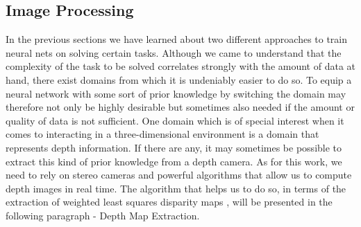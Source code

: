 \FloatBarrier
\subsection{Image Processing}
\label{sec::224_ip}
In the previous sections we have learned about two different approaches to train neural nets on solving certain tasks. Although we came to understand that the complexity of the task to be solved correlates strongly with the amount of data at hand, there exist domains from which it is undeniably easier to do so. To equip a neural network with some sort of prior knowledge by switching the domain may therefore not only be highly desirable but sometimes also needed if the amount or quality of data is not sufficient. One domain which is of special interest when it comes to interacting in a three-dimensional environment is a domain that represents depth information. If there are any, it may sometimes be possible to extract this kind of prior knowledge from a depth camera. As for this work, we need to rely on stereo cameras and powerful algorithms that allow us to compute depth images in real time. The algorithm that helps us to do so, in terms of the extraction of weighted least squares disparity maps \cite{min2014fast}, will be presented in the following paragraph - Depth Map Extraction.
\FloatBarrier
